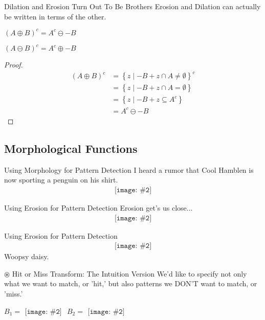 \documentclass{beamer}
\newcommand{\pic}[2]{
     \begin{array}{l}
      \texttt{[image: \#2]}
      \end{array}
}
\newcommand{\set}[1]{\left\lbrace #1 \right\rbrace}
\newcommand{\buildset}[2]{\set{#1 \mid #2}}
\newcommand{\intersect}{\cap}
\newcommand{\dilate}{\oplus}
\newcommand{\erode}{\ominus}
\newcommand{\hitmiss}{\circledast}
\begin{document}
\begin{frame}{Dilation and Erosion Turn Out To Be Brothers}
  Erosion and Dilation can actually be written in terms of the other.

  $(A \dilate B)^c = A^c \erode -B$

  $(A \erode B)^c = A^c \dilate -B$

  \begin{proof}
    \begin{align*}
        (A \dilate B)^c
      &=\buildset{z}{-B+z \intersect A \not= \emptyset}^c
    \\&=\buildset{z}{-B+z \intersect A = \emptyset}
    \\&=\buildset{z}{-B+z \subseteq A^c}
    \\&=A^c \erode -B
    \end{align*}
  \end{proof}
\end{frame}

\subsection{Morphological Functions}

\begin{frame}{Using Morphology for Pattern Detection}
  I heard a rumor that Cool Hamblen is now sporting a penguin on his
  shirt. 
  $$\pic{width=100pt}{images/tux_coolhamblen.png}$$
\end{frame}

\begin{frame}{Using Erosion for Pattern Detection}
  Erosion get's us close...
  $$\pic{width=100pt}{images/tux_coolhamblenhit1.png}$$
\end{frame}

\begin{frame}{Using Erosion for Pattern Detection}
$$\pic{width=100pt}{images/tux_coolhamblenhit2.png}$$
Woopsy daisy.
\end{frame}

\begin{frame}{$\hitmiss$ Hit or Miss Transform: The Intuition Version}
  We'd like to specify not only what we want to match, or 'hit,' 
  but also patterns we DON'T want to match, or 'miss.'

  $B_1 = \pic{width=100pt}{images/binarytux.png}$ 
  $B_2 = \pic{width=100pt}{images/binarytuxmiss.png}$
\end{frame}
\end{document}
